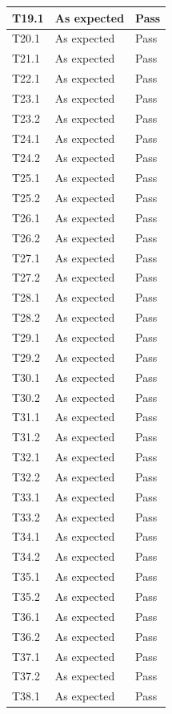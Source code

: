 \documentclass[]{article}
\begin{document}
\begin{longtable}{l|l|l}
T19.1 & As expected & Pass\\
\hline
T20.1 & As expected & Pass\\
\hline
T21.1 & As expected & Pass\\
\hline
T22.1 & As expected & Pass\\
\hline
T23.1 & As expected & Pass\\
\hline
T23.2 & As expected & Pass\\
\hline
T24.1 & As expected & Pass\\
\hline
T24.2 & As expected & Pass\\
\hline
T25.1 & As expected & Pass\\
\hline
T25.2 & As expected & Pass\\
\hline
T26.1 & As expected & Pass\\
\hline
T26.2 & As expected & Pass\\
\hline
T27.1 & As expected & Pass\\
\hline
T27.2 & As expected & Pass\\
\hline
T28.1 & As expected & Pass\\
\hline
T28.2 & As expected & Pass\\
\hline
T29.1 & As expected & Pass\\
\hline
T29.2 & As expected & Pass\\
\hline
T30.1 & As expected & Pass\\
\hline
T30.2 & As expected & Pass\\
\hline
T31.1 & As expected & Pass\\
\hline
T31.2 & As expected & Pass\\
\hline
T32.1 & As expected & Pass\\
\hline
T32.2 & As expected & Pass\\
\hline
T33.1 & As expected & Pass\\
\hline
T33.2 & As expected & Pass\\
\hline
T34.1 & As expected & Pass\\
\hline
T34.2 & As expected & Pass\\
\hline
T35.1 & As expected & Pass\\
\hline
T35.2 & As expected & Pass\\
\hline
T36.1 & As expected & Pass\\
\hline
T36.2 & As expected & Pass\\
\hline
T37.1 & As expected & Pass\\
\hline
T37.2 & As expected & Pass\\
\hline
T38.1 & As expected & Pass\\

\end{longtable}
\end{document}
